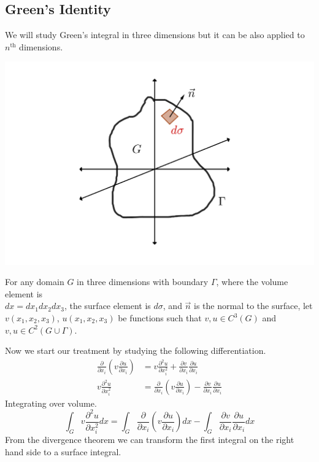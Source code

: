\subsection{Green's Identity}
We will study Green's integral in three dimensions but it can be also applied to $n^{\text{th}}$ dimensions.
\begin{center}
\includegraphics[scale=0.2]{green.png}
\end{center}
For any domain $G$ in three dimensions with boundary $\Gamma$, where the volume element is
\\
$dx = dx_1 dx_2 dx_3$, the surface element is $d\sigma$, and $\vec{n}$ is the normal to the surface, let $v(x_1,x_2,x_3)$, $u(x_1,x_2,x_3)$ be functions such that $v,u\in C^3(G)$ and $v,u\in C^2(G\cup \Gamma)$.
\par
Now we start our treatment by studying the following differentiation. 
\begin{align*}
\frac{\partial }{\partial x_i}\left(v\frac{\partial u}{\partial x_i}\right) &= v\frac{\partial^2 u}{\partial x_{i}^{2}} + \frac{\partial v}{\partial x_i}\frac{\partial u}{\partial x_i}
\\
v\frac{\partial^2 u}{\partial x_{i}^{2}} &= \frac{\partial }{\partial x_i}\left(v\frac{\partial u}{\partial x_i}\right) - \frac{\partial v}{\partial x_i}\frac{\partial u}{\partial x_i}
\end{align*}
Integrating over volume.
\[
    \int_G v\frac{\partial^2 u}{\partial x_{i}^{2}} dx = \int_G \frac{\partial }{\partial x_i}\left(v\frac{\partial u}{\partial x_i}\right) dx - \int_G \frac{\partial v}{\partial x_i}\frac{\partial u}{\partial x_i} dx    
\]
From the divergence theorem we can transform the first integral on the right hand side to a surface integral.
